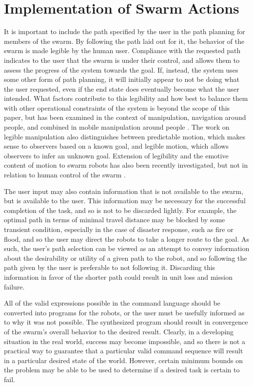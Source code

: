\chapter{Implementation of Swarm Actions} \label{chapter:Implementation_of_Swarm_Actions}

It is important to include the path specified by the user in the path planning for members of the swarm. 
By following the path laid out for it, the behavior of the swarm is made legible by the human user. 
Compliance with the requested path indicates to the user that the swarm is under their control, and allows them to assess the progress of the system towards the goal. 
If, instead, the system uses some other form of path planning, it will initially appear to not be doing what the user requested, even if the end state does eventually become what the user intended. 
What factors contribute to this legibility and how best to balance them with other operational constraints of the system is beyond the scope of this paper, but has been examined in the context of manipulation, navigation around people, and combined in mobile manipulation around people \citep{beetz2010generality, kruse2013human, dragan2015effects}.
The work on legible manipulation also distinguishes between predictable motion, which makes sense to observers based on a known goal, and legible motion, which allows observers to infer an unknown goal. 
Extension of legibility and the emotive content of motion to swarm robots has also been recently investigated, but not in relation to human control of the swarm \citep{Dietz:2017:HPS:3027063.3053220}.

The user input may also contain information that is not available to the swarm, but is available to the user. 
This information may be necessary for the successful completion of the task, and so is not to be discarded lightly. 
For example, the optimal path in terms of minimal travel distance may be blocked by some transient condition, especially in the case of disaster response, such as fire or flood, and so the user may direct the robots to take a longer route to the goal.
As such, the user's path selection can be viewed as an attempt to convey information about the desirability or utility of a given path to the robot, and so following the path given by the user is preferable to not following it.  
Discarding this information in favor of the shorter path could result in unit loss and mission failure.
 
All of the valid expressions possible in the command language should be converted into programs for the robots, or the user must be usefully informed as to why it was not possible. 
The synthesized program should result in convergence of the swarm's overall behavior to the desired result. 
Clearly, in a developing situation in the real world, success may become impossible, and so there is not a practical way to guarantee that a particular valid command sequence will result in a particular desired state of the world. 
However, certain minimum bounds on the problem may be able to be used to determine if a desired task is certain to fail. 

